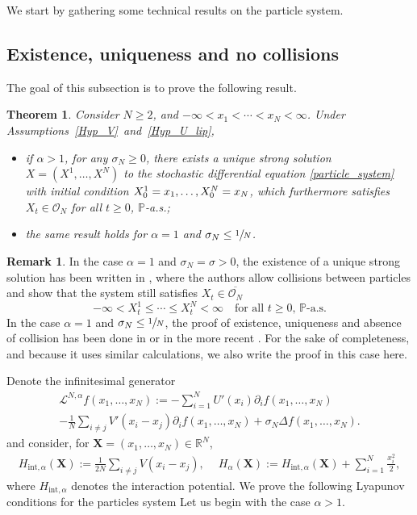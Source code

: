 \documentclass[JEP,XML,SOM,Unicode,published]{cedram}
\newcommand{\bX}{{\boldsymbol{X}}}
\newcommand{\rint}{\mathrm{int}}
\theoremstyle{plain}
\newtheorem{theorem}{Theorem}
\theoremstyle{definition}
\newtheorem{remark}{Remark}[section]
\begin{document}
We start by gathering some technical results on the particle system.

\subsection{Existence, uniqueness and no collisions}\label{sec_exist}

The goal of this subsection is to prove the following result.

\begin{theorem}\label{exist_unique}
Consider $N\geq 2$, and $-\infty<x_1<\cdots<x_N<\infty$. Under Assumptions~\ref{Hyp_V}~and~\ref{Hyp_U_lip},
\begin{itemize}
\item if $\alpha>1$, for any $\sigma_N\geq0$, there exists a unique strong solution $X=(X^1,\dots,X^N)$ to the stochastic differential equation \eqref{particle_system} with initial condition $X^1_0=x_1,\dots,\allowbreak X^N_0=\nobreak x_N$, which furthermore satisfies $X_t\in\mathcal{O}_N$ for all $t\geq0$, $\mathbb{P}$-a.s.;
\item the same result holds for $\alpha=1$ and $\sigma_N\leq\sfrac{1}{N}$.
\end{itemize}
\end{theorem}

\begin{remark}
In the case $\alpha=1$ and $\sigma_N=\sigma>0$, the existence of a unique strong solution has been written in \cite[Th.\,2.5]{cepa_lepingle}, where the authors allow collisions between particles and show that the system still satisfies $X_t\in\overline{\mathcal{O}_N}$ \ie
\[
-\infty<X^1_t\leq\cdots\leq X^N_t<\infty\quad\text{for all }t\geq0,\, \mathbb{P}\text{-a.s.}
\]
In the case $\alpha=1$ and $\sigma_N\leq\sfrac{1}{N}$, the proof of existence, uniqueness and absence of collision has been done in \cite{Rogers_Shi} or in the more recent \cite{Li_Li_Xie}. For the sake of completeness, and because it uses similar calculations, we also write the proof in this case here.
\end{remark}

Denote the infinitesimal generator
\begin{multline*}
\mathcal{L}^{N,\alpha}f(x_1,\dots,x_N):=-\sum_{i=1}^NU'(x_i)\partial_if(x_1,\dots,x_N)\\[-3pt]
-\frac{1}{N}\sum_{i\neq j}V'(x_i-x_j)\partial_if(x_1,\dots,x_N)+\sigma_N\Delta f(x_1,\dots,x_N).
\end{multline*}
and consider, for $\bX=(x_1,\dots,x_N)\in\mathbb{R}^N$,
\begin{align*}
H_{\rint, \alpha}(\bX):=\frac{1}{2N}\sum_{i\neq j}V(x_i-x_j),\quad \ H_{\alpha}(\bX):=H_{\rint, \alpha}(\bX)+\sum_{i=1}^N \frac{x^2_i}{2},
\end{align*}
where $H_{\rint,\alpha}$ denotes the interaction potential. We prove the following Lyapunov conditions for the particles system Let us begin with the case $\alpha>1$.
\end{document}
